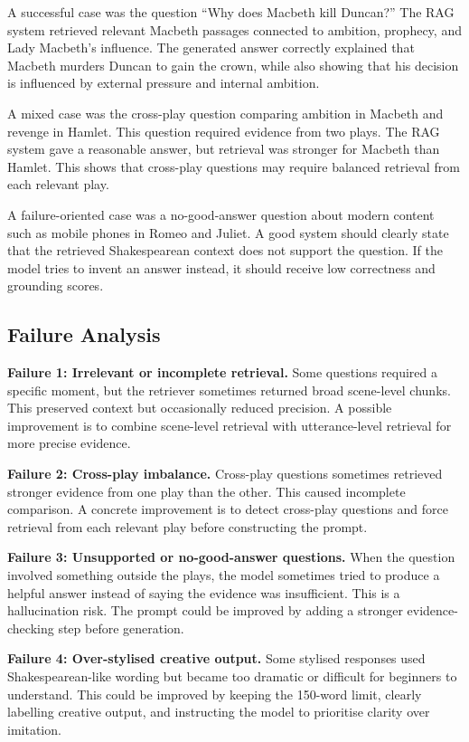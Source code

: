 \documentclass{article}
\begin{document}
A successful case was the question ``Why does Macbeth kill Duncan?'' The RAG system retrieved relevant Macbeth passages connected to ambition, prophecy, and Lady Macbeth's influence. The generated answer correctly explained that Macbeth murders Duncan to gain the crown, while also showing that his decision is influenced by external pressure and internal ambition.

A mixed case was the cross-play question comparing ambition in Macbeth and revenge in Hamlet. This question required evidence from two plays. The RAG system gave a reasonable answer, but retrieval was stronger for Macbeth than Hamlet. This shows that cross-play questions may require balanced retrieval from each relevant play.

A failure-oriented case was a no-good-answer question about modern content such as mobile phones in Romeo and Juliet. A good system should clearly state that the retrieved Shakespearean context does not support the question. If the model tries to invent an answer instead, it should receive low correctness and grounding scores.

\subsection{Failure Analysis}

\textbf{Failure 1: Irrelevant or incomplete retrieval.} Some questions required a specific moment, but the retriever sometimes returned broad scene-level chunks. This preserved context but occasionally reduced precision. A possible improvement is to combine scene-level retrieval with utterance-level retrieval for more precise evidence.

\textbf{Failure 2: Cross-play imbalance.} Cross-play questions sometimes retrieved stronger evidence from one play than the other. This caused incomplete comparison. A concrete improvement is to detect cross-play questions and force retrieval from each relevant play before constructing the prompt.

\textbf{Failure 3: Unsupported or no-good-answer questions.} When the question involved something outside the plays, the model sometimes tried to produce a helpful answer instead of saying the evidence was insufficient. This is a hallucination risk. The prompt could be improved by adding a stronger evidence-checking step before generation.

\textbf{Failure 4: Over-stylised creative output.} Some stylised responses used Shakespearean-like wording but became too dramatic or difficult for beginners to understand. This could be improved by keeping the 150-word limit, clearly labelling creative output, and instructing the model to prioritise clarity over imitation.
\end{document}
